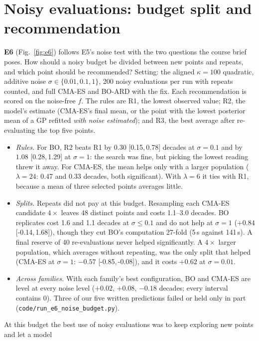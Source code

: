 \documentclass[10pt,a4paper]{article}
\newcommand{\ci}[2]{[#1,\,#2]}      %
\begin{document}
\section{Noisy evaluations: budget split and recommendation}\label{sec:noise}
\textbf{E6} (Fig.~\ref{fig:e6}) follows E5's noise test with the two questions the course brief poses.
How should a noisy budget be divided between new points and repeats, and which point should be
recommended? Setting: the aligned $\kappa=100$ quadratic, additive noise $\sigma\in\{0.01,0.1,1\}$, 200
noisy evaluations per run with repeats counted, and full CMA-ES and BO-ARD with the fix. Each
recommendation is scored on the noise-free $f$. The rules are R1, the lowest observed value; R2, the
model's estimate (CMA-ES's final mean, or the point with the lowest posterior mean of a GP refitted
\emph{with noise estimated}); and R3, the best average after re-evaluating the top five points.
\begin{itemize}
\item \emph{Rules.} For BO, R2 beats R1 by $0.30$ \ci{0.15}{0.78} decades at $\sigma=0.1$ and by $1.08$
\ci{0.28}{1.29} at $\sigma=1$: the search was fine, but picking the lowest reading threw it away. For
CMA-ES, the mean helps only with a larger population ($\lambda=24$: 0.47 and 0.33 decades, both
significant). With $\lambda=6$ it ties with R1, because a mean of three selected points averages little.
\item \emph{Splits.} Repeats did not pay at this budget. Resampling each CMA-ES candidate $4\times$
leaves 48 distinct points and costs 1.1--3.0 decades. BO replicates cost 1.6 and 1.1 decades at
$\sigma\le0.1$ and do not help at $\sigma=1$ ($+0.84$ \ci{-0.14}{1.68}), though they cut BO's computation
27-fold (5\,s against 141\,s). A final reserve of 40 re-evaluations never helped significantly. A
$4\times$ larger population, which averages without repeating, was the only split that helped (CMA-ES at
$\sigma=1$: $-0.57$ \ci{-0.85}{-0.08}), and it costs $+0.62$ at $\sigma=0.01$.
\item \emph{Across families.} With each family's best configuration, BO and CMA-ES are level at every
noise level ($+0.02$, $+0.08$, $-0.18$ decades; every interval contains 0). Three of our five written
predictions failed or held only in part (\texttt{code/run\_e6\_noise\_budget.py}).
\end{itemize}
At this budget the best use of noisy evaluations was to keep exploring new points and let a model
\end{document}

